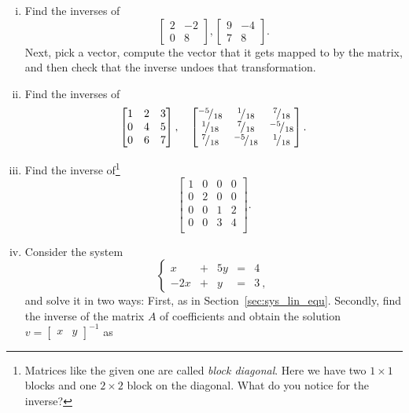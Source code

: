 \begin{exercise}
\begin{enumerate}[(i)]
	\item Find the inverses of 
	\[ \begin{bmatrix} 2 & -2 \\ 0 & 8 \end{bmatrix}, 
	\begin{bmatrix}	9 & -4 \\ 7 & 8 \end{bmatrix}. \]
	Next, pick a vector, compute the vector that it gets mapped to by the matrix, and then check that the inverse undoes that transformation.
	\item Find the inverses of
	\[ \begin{bmatrix}
	1 & 2 & 3 \\ 0 & 4 & 5 \\ 0 & 6 & 7
	\end{bmatrix}, \quad
	\begin{bmatrix}
	\rfrac{-5}{18} & \rfrac{1}{18} & \rfrac{7}{18} \\
	\rfrac{1}{18} & \rfrac{7}{18} & \rfrac{-5}{18} \\
	\rfrac{7}{18} & \rfrac{-5}{18} & \rfrac{1}{18}
	\end{bmatrix}. \]
	\item Find the inverse of\footnote{Matrices like the given one are called \emph{block diagonal}. Here we have two $1 \times 1$ blocks and one $2 \times 2$ block on the diagonal. What do you notice for the inverse?}
\[ \begin{bmatrix}
1 & 0 & 0 & 0 \\ 0 & 2 & 0 & 0 \\  
0 & 0 & 1 & 2 \\
0 & 0 & 3 & 4 \\
\end{bmatrix}. \]
	\item Consider the system
	\begin{equation*}
	\left\{\begin{array}{rcrcl}
	x & + & 5y & = & 4 \\
	-2x & + & y & = & 3 \:,
	\end{array}\right.
	\end{equation*}
	and solve it in two ways: First, as in Section~\ref{sec:sys_lin_equ}. Secondly, find the inverse of the matrix $A$ of coefficients and obtain the solution $v = \begin{bmatrix} x & y \end{bmatrix}^{-1}$ as

\end{enumerate}
\end{exercise}
